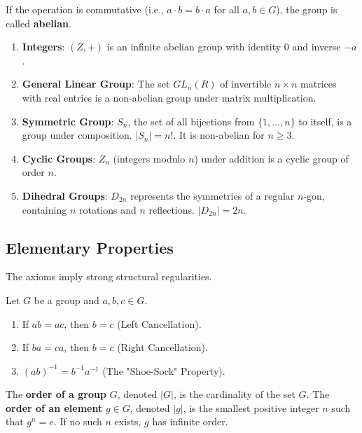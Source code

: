 \begin{definition}
If the operation is commutative (i.e., $a \cdot b = b \cdot a$ for all $a, b \in G$), the group is called \textbf{abelian}.
\end{definition}

\newpage

\begin{example}
\begin{enumerate}
    \item \textbf{Integers}: $(Z, +)$ is an infinite abelian group with identity $0$ and inverse $-a$.
    \item \textbf{General Linear Group}: The set $GL_n(R)$ of invertible $n \times n$ matrices with real entries is a non-abelian group under matrix multiplication.
    \item \textbf{Symmetric Group}: $S_n$, the set of all bijections from $\{1, \dots, n\}$ to itself, is a group under composition. $|S_n| = n!$. It is non-abelian for $n \geq 3$.
    \item \textbf{Cyclic Groups}: $Z_n$ (integers modulo $n$) under addition is a cyclic group of order $n$.
    \item \textbf{Dihedral Groups}: $D_{2n}$ represents the symmetries of a regular $n$-gon, containing $n$ rotations and $n$ reflections. $|D_{2n}| = 2n$.
\end{enumerate}
\end{example}

\subsection{Elementary Properties}

The axioms imply strong structural regularities.

\begin{proposition}
Let $G$ be a group and $a, b, c \in G$.
\begin{enumerate}
    \item If $ab = ac$, then $b=c$ (Left Cancellation).
    \item If $ba = ca$, then $b=c$ (Right Cancellation).
    \item $(ab)^{-1} = b^{-1}a^{-1}$ (The "Shoe-Sock" Property).
\end{enumerate}
\end{proposition}

\begin{definition}[Order]
The \textbf{order of a group} $G$, denoted $|G|$, is the cardinality of the set $G$. The \textbf{order of an element} $g \in G$, denoted $|g|$, is the smallest positive integer $n$ such that $g^n = e$. If no such $n$ exists, $g$ has infinite order.
\end{definition}

